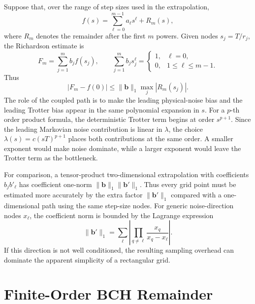 \documentclass[11pt]{article}
\begin{document}
Suppose that, over the range of step sizes used in the extrapolation,
\begin{equation}
    f(s)=\sum_{\ell=0}^{m-1} a_\ell s^\ell + R_m(s),
\end{equation}
where $R_m$ denotes the remainder after the first $m$ powers. Given nodes $s_j=T/r_j$, the Richardson estimate is
\begin{equation}
    F_m=\sum_{j=1}^{m} b_j f(s_j),\qquad
    \sum_{j=1}^{m} b_j s_j^\ell =
    \begin{cases}
    1, & \ell=0,\\
    0, & 1\le \ell\le m-1 .
    \end{cases}
\end{equation}
Thus
\begin{equation}
    |F_m-f(0)|\le \|\bm b\|_1\max_j |R_m(s_j)|.
\end{equation}
The role of the coupled path is to make the leading physical-noise bias and the leading Trotter bias appear in the same polynomial expansion in $s$. For a $p$-th order product formula, the deterministic Trotter term begins at order $s^{p+1}$. Since the leading Markovian noise contribution is linear in $\lambda$, the choice $\lambda(s)=c(sT)^{p+1}$ places both contributions at the same order. A smaller exponent would make noise dominate, while a larger exponent would leave the Trotter term as the bottleneck.

For comparison, a tensor-product two-dimensional extrapolation with coefficients $b_jb'_\ell$ has coefficient one-norm $\|\bm b\|_1\|\bm b'\|_1$. Thus every grid point must be estimated more accurately by the extra factor $\|\bm b'\|_1$ compared with a one-dimensional path using the same step-size nodes. For generic noise-direction nodes $x_\ell$, the coefficient norm is bounded by the Lagrange expression
\begin{equation}
    \|\bm b'\|_1
    =
    \sum_{\ell}
    \left|
    \prod_{q\ne \ell}\frac{x_q}{x_q-x_\ell}
    \right|.
\end{equation}
If this direction is not well conditioned, the resulting sampling overhead can dominate the apparent simplicity of a rectangular grid.

\section{Finite-Order BCH Remainder}
\end{document}
